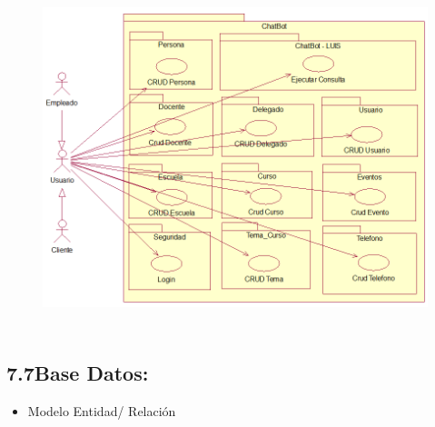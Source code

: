 \documentclass[12pt]{report}
\begin{document}
\begin{figure}[H]
	\begin{Center}
		\includegraphics[width=5.07in,height=3.94in]{./media/image7.png}
	\end{Center}
\end{figure}



\par




\newpage

\vspace{\baselineskip}\subsection*{7.7\hspace*{10pt}Base Datos:}
\begin{itemize}
	\item {\fontsize{10pt}{12.0pt}\selectfont Modelo Entidad/ Relación \par}
\end{itemize}\par



\end{document}
